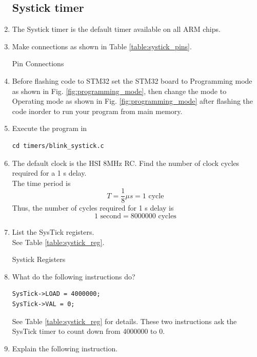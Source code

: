 \documentclass[journal,12pt,twocolumn]{IEEEtran}
\renewcommand\thesection{\arabic{section}}
\renewcommand\thesubsection{\thesection.\arabic{subsection}}
\begin{document}
\begin{enumerate}[label=\thesubsection.\arabic*.,ref=\thesubsection.\theenumi]
\subsection{Systick timer}
\item The Systick timer is the default timer available on all ARM chips. 
\item Make connections as shown in Table \ref{table:systick_pins}.
\begin{table}[!ht]
\centering
\footnotesize

\caption{Pin Connections}
\label{table:systick_pins}
\end{table}
\item Before flashing code to STM32 set the STM32 board to Programming mode as shown in Fig. \ref{fig:programming_mode}, then change the mode to Operating mode as shown in Fig. \ref{fig:programming_mode} after flashing the code inorder to run your program from main memory.
\item Execute the program in 
\begin{lstlisting}
cd timers/blink_systick.c
\end{lstlisting}
\item The default clock is the HSI 8MHz RC.  Find the number of clock cycles required for a 1 s delay.
\\
\solution The time period is
\begin{equation}
T = \frac{1}{8}\mu s = 1 \text{ cycle}
\end{equation}
Thus, the number of cycles required for 1 s delay is
\begin{equation}
1 \text{ second} = 8000000 \text{ cycles}
\end{equation}
\item List the SysTick registers.
\\
\solution See Table \ref{table:systick_reg}.
\begin{table}[!ht]
\footnotesize
\centering

\caption{Systick Registers}
\label{table:systick_reg}
\end{table}
\item What do the following instructions do?
\begin{lstlisting}
SysTick->LOAD = 4000000;
SysTick->VAL = 0;
\end{lstlisting}
\solution See Table \ref{table:systick_reg} for details.  These two instructions ask the SysTick timer to count down from 4000000 to 0.  
\item Explain the following instruction.

\end{enumerate}
\end{document}
